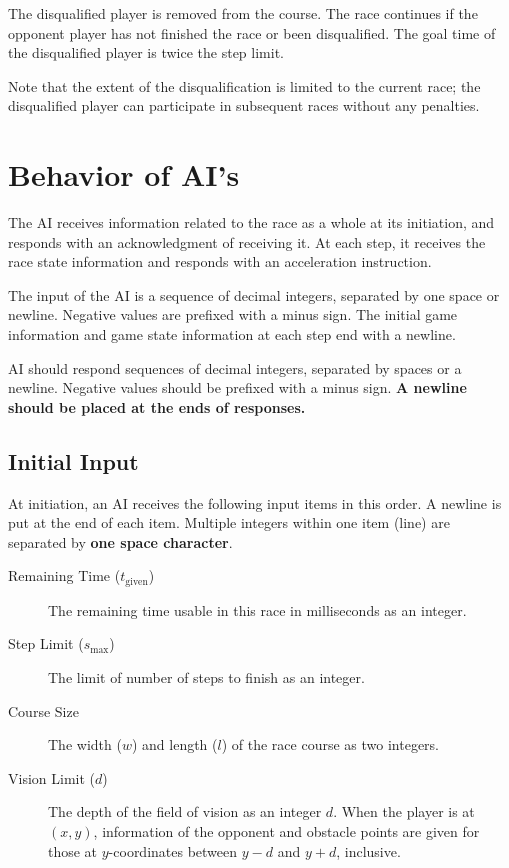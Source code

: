 \documentclass[11pt]{article}
\begin{document}
The disqualified player is removed from the course.  The race
continues if the opponent player has not finished the race or been
disqualified. The goal time of the disqualified player is twice the
step limit.

Note that the extent of the disqualification is limited to the current
race; the disqualified player can participate in subsequent races
without any penalties.

\section{Behavior of AI's}

The AI receives information related to the race as a whole at its
initiation, and responds with an acknowledgment of receiving it.  At
each step, it receives the race state information and responds with an
acceleration instruction.

The input of the AI is a sequence of decimal integers, separated by
one space or newline.  Negative values are prefixed with a minus
sign.  The initial game information and game state information at each
step end with a newline.

AI should respond sequences of decimal integers, separated by
spaces or a newline.  Negative values should be prefixed with a minus
sign.  {\bf A newline should be placed at the ends of responses.}

\subsection{Initial Input}
At initiation, an AI receives the following input items in this order.
A newline is put at the end of each item. Multiple integers within one item (line) are separated by {\bf one space character}.
\begin{description}
\item[Remaining Time ($t_\mathrm{given}$)] The remaining time usable in this race in
  milliseconds as an integer.
\item[Step Limit ($s_\mathrm{max}$)] The limit of number of steps to finish as an integer.
\item[Course Size] The width ($w$) and length ($l$) of the race course as two integers.
\item[Vision Limit ($d$)] The depth of the field of vision as an integer
  $d$. When the player is at $(x, y)$, information of the opponent and
  obstacle points are given for those at $y$-coordinates between $y-d$
  and $y+d$, inclusive.
\end{description}
\end{document}
